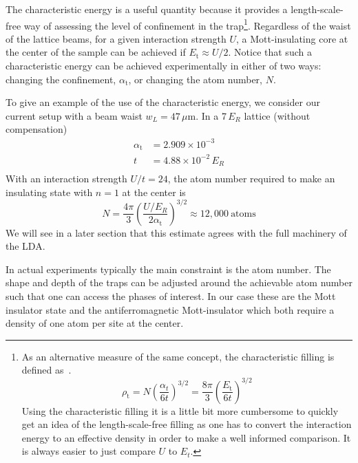 \documentclass[11pt,letter]{article}
\begin{document}
The characteristic energy is a useful quantity because it provides a
length-scale-free way of assessing  the level of confinement in the
trap\footnote{ As an alternative measure of the same concept, the
characteristic filling is defined as~\cite{Jordens2010}.
\begin{equation} 
    \rho_{\text{t}} = N \left( \frac{ \alpha_{t} }{ 6 t } \right)^{3/2}
    =  \frac{8\pi}{3} \left( \frac{ E_{\text{t}} }{ 6 t}   \right)^{3/2}  
\end{equation}
Using the characteristic filling it is a little bit more cumbersome to quickly
get an idea of the length-scale-free filling as one has to convert the
interaction energy to an effective density in order to make a well informed
comparison.   It is always easier to just compare $U$ to $E_{t}$. }.
Regardless of the waist of the lattice beams, for a given interaction strength
$U$, a Mott-insulating core  at the center of the sample  can be achieved if
$E_{\text{t}} \approx U/2 $.   Notice that such a characteristic energy
can be achieved experimentally in either of two ways: changing the confinement,
$\alpha_{\text{t}}$, or changing the atom number, $N$.  


To give an example of the use of the characteristic energy, we consider our
current setup with a beam waist $w_{L}=47\,\mu$m.   In a 7\,$E_{R}$ lattice
(without compensation)
\begin{equation}
\begin{split}
  \alpha_{\text{t}} & =  2.909 \times 10^{-3} \\
   t & = 4.88 \times 10^{-2}\,E_{R}  \\ 
\end{split}
\end{equation}
With an interaction strength $U/t = 24$, the atom number required to make an
insulating state with $n=1$ at the center is 
\begin{equation} 	
 N = \frac{4\pi}{3}  
    \left(  \frac{ U/E_{R} }{ 2 \alpha_{\text{t}} } \right)^{3/2}  
     \approx 12,000 \ \text{atoms}  
\end{equation}
We will see in a later section that this estimate agrees with the full
machinery of the LDA.  

In actual experiments typically the main constraint is the atom number.  The
shape and depth of the traps can be adjusted around the achievable atom number
such that one can access the phases of interest.  In our case these are
the Mott insulator state and the antiferromagnetic Mott-insulator
which both require a density of one atom per site at the center.  
\end{document}
